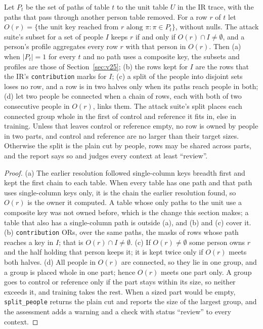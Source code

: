 \setcounter{proposition}{1699}
\begin{proposition}\label{prop:unionown}
Let $P_t$ be the set of paths of table $t$ to the unit table $U$ in the IR trace, with the paths that pass through another person table removed. For a row $r$ of $t$ let $O(r)=\{\text{the unit key reached from } r \text{ along } \pi : \pi\in P_t\}$, without nulls. The attack suite's subset for a set of people $I$ keeps $r$ if and only if $O(r)\cap I\neq\emptyset$, and a person's profile aggregates every row $r$ with that person in $O(r)$. Then (a) when $|P_t|=1$ for every $t$ and no path uses a composite key, the subsets and profiles are those of Section~\ref{sec:v25}; (b) the rows kept for $I$ are the rows that the IR's \texttt{contribution} marks for $I$; (c) a split of the people into disjoint sets loses no row, and a row is in two halves only when its paths reach people in both; (d) let two people be connected when a chain of rows, each with both of two consecutive people in $O(r)$, links them. The attack suite's split places each connected group whole in the first of control and reference it fits in, else in training. Unless that leaves control or reference empty, no row is owned by people in two parts, and control and reference are no larger than their target sizes. Otherwise the split is the plain cut by people, rows may be shared across parts, and the report says so and judges every context at least ``review''.
\end{proposition}
\begin{proof}
(a) The earlier resolution followed single-column keys breadth first and kept the first chain to each table. When every table has one path and that path uses single-column keys only, it is the chain the earlier resolution found, so $O(r)$ is the owner it computed. A table whose only paths to the unit use a composite key was not owned before, which is the change this section makes; a table that also has a single-column path is outside (a), and (b) and (c) cover it. (b) \texttt{contribution} ORs, over the same paths, the masks of rows whose path reaches a key in $I$; that is $O(r)\cap I\neq\emptyset$. (c) If $O(r)\neq\emptyset$ some person owns $r$ and the half holding that person keeps it; it is kept twice only if $O(r)$ meets both halves. (d) All people in $O(r)$ are connected, so they lie in one group, and a group is placed whole in one part; hence $O(r)$ meets one part only. A group goes to control or reference only if the part stays within its size, so neither exceeds it, and training takes the rest. When a sized part would be empty, \texttt{split\_people} returns the plain cut and reports the size of the largest group, and the assessment adds a warning and a check with status ``review'' to every context.
\end{proof}
